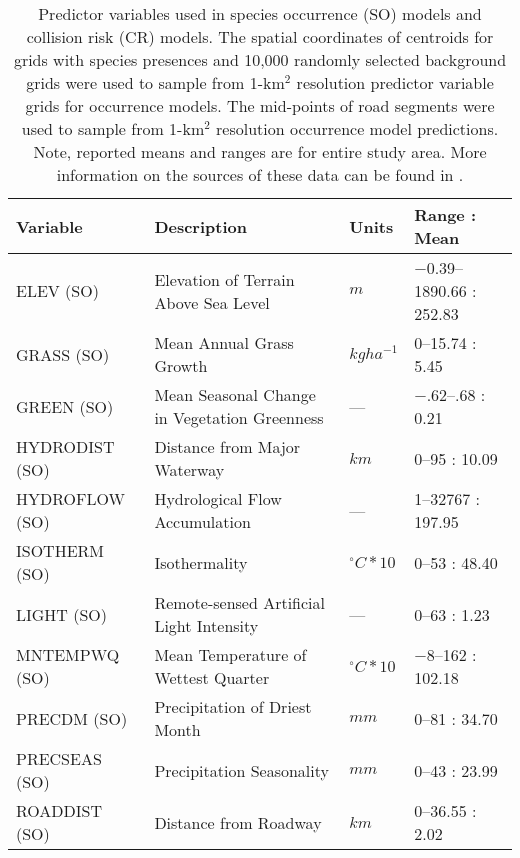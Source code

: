 \begin{table}[!t]
\caption[Predictor variables used in species occurrence models and collision risk models]{Predictor variables used in species occurrence (SO) models and collision risk (CR) models. The spatial coordinates of centroids for grids with species presences and 10,000 randomly selected background grids were used to sample from 1-km$^2$ resolution predictor variable grids for occurrence models. The mid-points of road segments were used to sample from 1-km$^2$ resolution occurrence model predictions. Note, reported means and ranges are for entire study area. More information on the sources of these data can be found in .}
\centering
\setlength{\extrarowheight}{.2em}
\begin{tabularx}{0.9\textwidth}{lYll} \toprule
Variable       &Description                                               &Units          &Range : Mean\\
\midrule 
ELEV (SO)       &Elevation of Terrain Above Sea Level                     &$m$			  &$-$0.39--1890.66 : 252.83\\
GRASS (SO)      &Mean Annual Grass Growth \citep{cart03}	              &$kg ha^{-1}$   &0--15.74 : 5.45\\
GREEN (SO)      &Mean Seasonal Change in Vegetation Greenness             &---            &$-$.62--.68 : 0.21\\
HYDRODIST (SO)  &Distance from Major Waterway                             &$km$           &0--95 : 10.09\\
HYDROFLOW (SO)  &Hydrological Flow Accumulation                           &---            &1--32767 : 197.95\\
ISOTHERM (SO)   &Isothermality                                            &$^{\circ}C*10$ &0--53 : 48.40\\
LIGHT (SO)      &Remote-sensed Artificial Light Intensity                 &---            &0--63 : 1.23\\
MNTEMPWQ (SO)   &Mean Temperature of Wettest Quarter                      &$^{\circ}C*10$ &$-$8--162 : 102.18\\
PRECDM (SO)     &Precipitation of Driest Month                            &$mm$           &0--81 : 34.70\\
PRECSEAS (SO)   &Precipitation Seasonality                                &$mm$           &0--43 : 23.99\\
ROADDIST (SO)   &Distance from Roadway                                    &$km$           &0--36.55 : 2.02\\

\end{tabularx}
\end{table}
